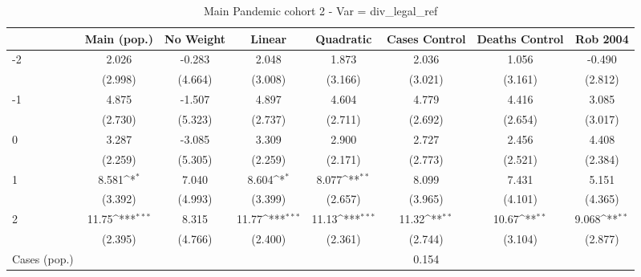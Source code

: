 \documentclass{article}
\begin{document}
{
\def\sym#1{\ifmmode^{#1}\else\(^{#1}\)\fi}
\begin{longtable}{l*{7}{c}}
\caption{Main Pandemic cohort 2 - Var = div\_legal\_ref}\\
\hline\hline\endfirsthead\hline\endhead\hline\endfoot\endlastfoot
                &\multicolumn{1}{c}{Main (pop.)}&\multicolumn{1}{c}{No Weight}&\multicolumn{1}{c}{Linear}&\multicolumn{1}{c}{Quadratic}&\multicolumn{1}{c}{Cases Control}&\multicolumn{1}{c}{Deaths Control}&\multicolumn{1}{c}{Rob 2004}\\
\hline
-2              &    2.026         &   -0.283         &    2.048         &    1.873         &    2.036         &    1.056         &   -0.490         \\
                &  (2.998)         &  (4.664)         &  (3.008)         &  (3.166)         &  (3.021)         &  (3.161)         &  (2.812)         \\
-1              &    4.875         &   -1.507         &    4.897         &    4.604         &    4.779         &    4.416         &    3.085         \\
                &  (2.730)         &  (5.323)         &  (2.737)         &  (2.711)         &  (2.692)         &  (2.654)         &  (3.017)         \\
0               &    3.287         &   -3.085         &    3.309         &    2.900         &    2.727         &    2.456         &    4.408         \\
                &  (2.259)         &  (5.305)         &  (2.259)         &  (2.171)         &  (2.773)         &  (2.521)         &  (2.384)         \\
1               &    8.581\sym{*}  &    7.040         &    8.604\sym{*}  &    8.077\sym{**} &    8.099         &    7.431         &    5.151         \\
                &  (3.392)         &  (4.993)         &  (3.399)         &  (2.657)         &  (3.965)         &  (4.101)         &  (4.365)         \\
2               &    11.75\sym{***}&    8.315         &    11.77\sym{***}&    11.13\sym{***}&    11.32\sym{**} &    10.67\sym{**} &    9.068\sym{**} \\
                &  (2.395)         &  (4.766)         &  (2.400)         &  (2.361)         &  (2.744)         &  (3.104)         &  (2.877)         \\
Cases (pop.)    &                  &                  &                  &                  &    0.154         &                  &                  \\

\end{longtable}}
\end{document}
